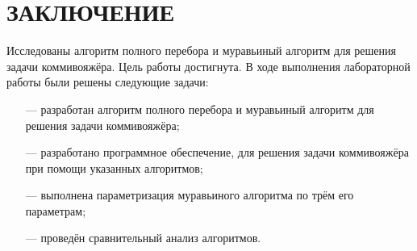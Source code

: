 \chapter*{\hfill{\centering \MakeUppercase{Заключение}}\hfill}

Исследованы алгоритм полного перебора и муравьиный алгоритм для решения задачи коммивояжёра. Цель работы достигнута. В ходе выполнения лабораторной работы были решены следующие задачи:

\begin{itemize}
    \item[---] разработан алгоритм полного перебора и муравьиный алгоритм для решения задачи коммивояжёра;
    \item[---] разработано программное обеспечение, для решения задачи коммивояжёра при помощи указанных алгоритмов;
    \item[---] выполнена параметризация муравьиного алгоритма по трём его параметрам;
    \item[---] проведён сравнительный анализ алгоритмов.
\end{itemize}
